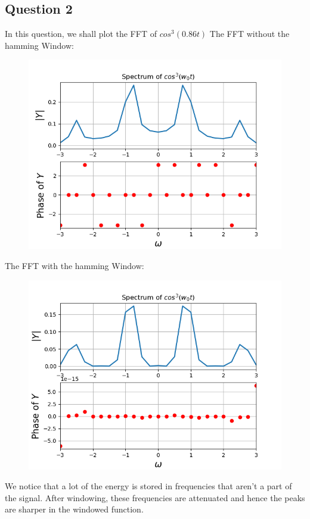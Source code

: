 \documentclass[11pt, a4paper]{article}
\begin{document}
\subsection{Question 2}
In this question, we shall plot the FFT of $cos^3(0.86t)$
The FFT without the hamming Window:
\begin{figure}[h!]
\centering
\includegraphics[scale=0.6]{fig7.png}
\label{fig:universe}
\end{figure}
\clearpage
The FFT with the hamming Window:
\begin{figure}[h!]
\centering
\includegraphics[scale=0.6]{fig8.png}
\label{fig:universe}
\end{figure}
\clearpage
We notice that a lot of the energy is stored in frequencies that aren't a part of the signal. After windowing, these frequencies are attenuated and hence the peaks are sharper in the windowed function. 
\end{document}
